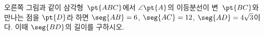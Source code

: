 \noindent\begin{minipage}[t]{0.58\linewidth}\vspace{0pt}\raggedright 오른쪽 그림과 같이 삼각형~$\pt{ABC}$에서 $\angle\pt{A}$의 이등분선이 변~$\pt{BC}$와 만나는 점을 $\pt{D}$라 하면 $\seg{AB}=6$, $\seg{AC}=12$, $\seg{AD}=4\sqrt{3}$이다. 이때 $\seg{BD}$의 길이를 구하시오.\end{minipage}\hfill\begin{minipage}[t]{0.4\linewidth}\vspace{0pt}\centering \resizebox{\ifdim\width>\linewidth\linewidth\else\width\fi}{!}{}\end{minipage}\par
